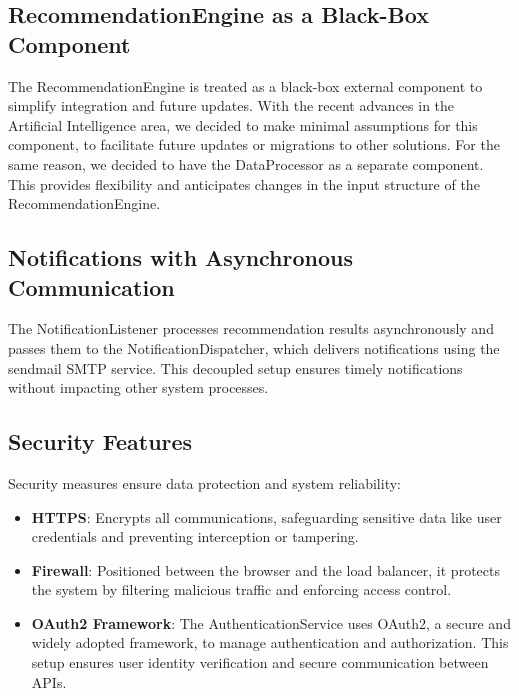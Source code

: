 \subsection{RecommendationEngine as a Black-Box Component}
The RecommendationEngine is treated as a black-box external component to simplify integration and future updates. With the recent advances in the Artificial Intelligence area, we decided to make minimal assumptions for this component, to facilitate future updates or migrations to other solutions.
For the same reason, we decided to have the DataProcessor as a separate component. This provides flexibility and anticipates changes in the input structure of the RecommendationEngine.

\subsection{Notifications with Asynchronous Communication}
The NotificationListener processes recommendation results asynchronously and passes them to the NotificationDispatcher, which delivers notifications using the sendmail SMTP service. This decoupled setup ensures timely notifications without impacting other system processes.

\subsection{Security Features}
Security measures ensure data protection and system reliability:

\begin{itemize}
    \item \textbf{HTTPS}: Encrypts all communications, safeguarding sensitive data like user credentials and preventing interception or tampering.
    \item \textbf{Firewall}: Positioned between the browser and the load balancer, it protects the system by filtering malicious traffic and enforcing access control.
    \item \textbf{OAuth2 Framework}: The AuthenticationService uses OAuth2, a secure and widely adopted framework, to manage authentication and authorization. This setup ensures user identity verification and secure communication between APIs.
\end{itemize}


